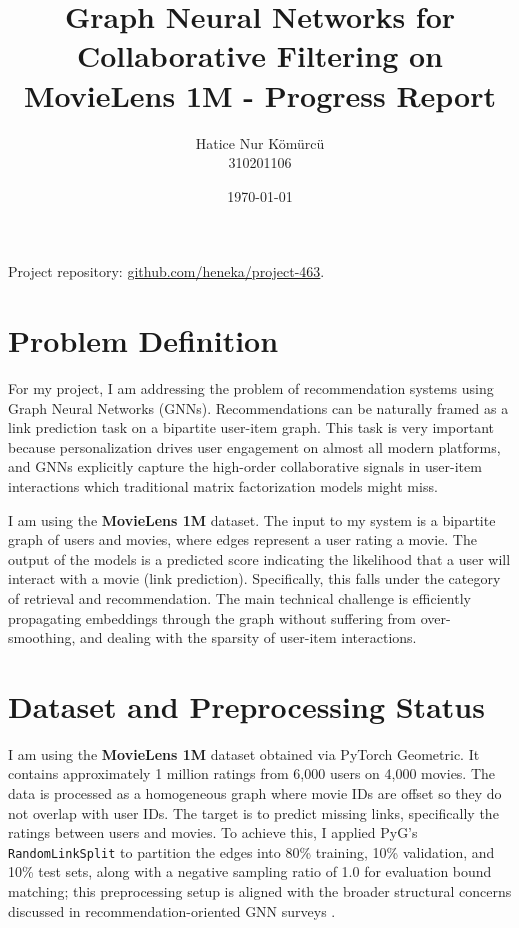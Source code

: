 \documentclass[12pt, a4paper]{article}
\title{Graph Neural Networks for Collaborative Filtering on MovieLens 1M - Progress Report}
\author{Hatice Nur Kömürcü \\ 310201106}
\date{\today}
\begin{document}
\maketitle

\noindent Project repository: \href{https://github.com/heneka/project-463}{github.com/heneka/project-463}.

\section{Problem Definition}

For my project, I am addressing the problem of recommendation systems using Graph Neural Networks (GNNs). Recommendations can be naturally framed as a link prediction task on a bipartite user-item graph. This task is very important because personalization drives user engagement on almost all modern platforms, and GNNs explicitly capture the high-order collaborative signals in user-item interactions which traditional matrix factorization models might miss. 

I am using the \textbf{MovieLens 1M} dataset. The input to my system is a bipartite graph of users and movies, where edges represent a user rating a movie. The output of the models is a predicted score indicating the likelihood that a user will interact with a movie (link prediction). Specifically, this falls under the category of retrieval and recommendation. The main technical challenge is efficiently propagating embeddings through the graph without suffering from over-smoothing, and dealing with the sparsity of user-item interactions.

\section{Dataset and Preprocessing Status}
I am using the \textbf{MovieLens 1M} dataset obtained via PyTorch Geometric. It contains approximately 1 million ratings from 6,000 users on 4,000 movies. The data is processed as a homogeneous graph where movie IDs are offset so they do not overlap with user IDs. The target is to predict missing links, specifically the ratings between users and movies. To achieve this, I applied PyG's \texttt{RandomLinkSplit} to partition the edges into 80\% training, 10\% validation, and 10\% test sets, along with a negative sampling ratio of 1.0 for evaluation bound matching; this preprocessing setup is aligned with the broader structural concerns discussed in recommendation-oriented GNN surveys \cite{shafiq2023review}. 
\end{document}
